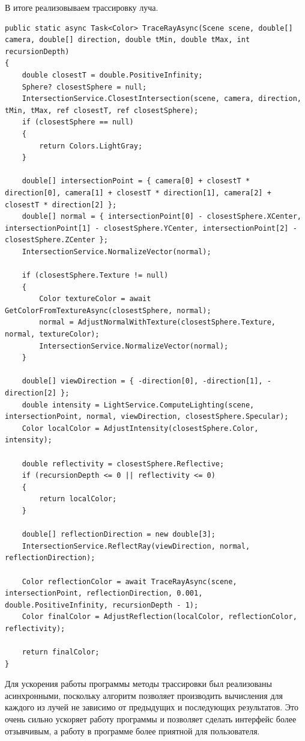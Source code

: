 В итоге реализовываем трассировку луча.
\begin{lstlisting}[caption={Трассировка луча.}, label={lst:3-6}]
public static async Task<Color> TraceRayAsync(Scene scene, double[] camera, double[] direction, double tMin, double tMax, int recursionDepth)
{
	double closestT = double.PositiveInfinity;
	Sphere? closestSphere = null;
	IntersectionService.ClosestIntersection(scene, camera, direction, tMin, tMax, ref closestT, ref closestSphere);
	if (closestSphere == null)
	{
		return Colors.LightGray;
	}
	
	double[] intersectionPoint = { camera[0] + closestT * direction[0], camera[1] + closestT * direction[1], camera[2] + closestT * direction[2] };
	double[] normal = { intersectionPoint[0] - closestSphere.XCenter, intersectionPoint[1] - closestSphere.YCenter, intersectionPoint[2] - closestSphere.ZCenter };
	IntersectionService.NormalizeVector(normal);
	
	if (closestSphere.Texture != null)
	{
		Color textureColor = await GetColorFromTextureAsync(closestSphere, normal);
		normal = AdjustNormalWithTexture(closestSphere.Texture, normal, textureColor);
		IntersectionService.NormalizeVector(normal);
	}
	
	double[] viewDirection = { -direction[0], -direction[1], -direction[2] };
	double intensity = LightService.ComputeLighting(scene, intersectionPoint, normal, viewDirection, closestSphere.Specular);
	Color localColor = AdjustIntensity(closestSphere.Color, intensity);
	
	double reflectivity = closestSphere.Reflective;
	if (recursionDepth <= 0 || reflectivity <= 0)
	{
		return localColor;
	}
	
	double[] reflectionDirection = new double[3];
	IntersectionService.ReflectRay(viewDirection, normal, reflectionDirection);
	
	Color reflectionColor = await TraceRayAsync(scene, intersectionPoint, reflectionDirection, 0.001, double.PositiveInfinity, recursionDepth - 1);
	Color finalColor = AdjustReflection(localColor, reflectionColor, reflectivity);
	
	return finalColor;
}
\end{lstlisting}

Для ускорения работы программы методы трассировки был реализованы асинхронными, поскольку алгоритм позволяет производить вычисления для каждого из лучей не зависимо от предыдущих и последующих результатов. Это очень сильно ускоряет работу программы и позволяет сделать интерфейс более отзывчивым, а работу в программе более приятной для пользователя.

